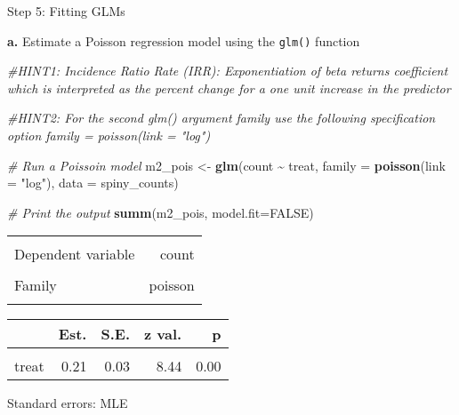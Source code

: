 \documentclass[
]{article}
\newenvironment{Shaded}{\begin{snugshade}}{\end{snugshade}}
\newcommand{\AttributeTok}[1]{\textcolor[rgb]{0.13,0.29,0.53}{#1}}
\newcommand{\CommentTok}[1]{\textcolor[rgb]{0.56,0.35,0.01}{\textit{#1}}}
\newcommand{\ConstantTok}[1]{\textcolor[rgb]{0.56,0.35,0.01}{#1}}
\newcommand{\FunctionTok}[1]{\textcolor[rgb]{0.13,0.29,0.53}{\textbf{#1}}}
\newcommand{\NormalTok}[1]{#1}
\newcommand{\OtherTok}[1]{\textcolor[rgb]{0.56,0.35,0.01}{#1}}
\newcommand{\SpecialCharTok}[1]{\textcolor[rgb]{0.81,0.36,0.00}{\textbf{#1}}}
\newcommand{\StringTok}[1]{\textcolor[rgb]{0.31,0.60,0.02}{#1}}
\begin{document}
Step 5: Fitting GLMs

\textbf{a.} Estimate a Poisson regression model using the \texttt{glm()}
function

\begin{Shaded}
\begin{Highlighting}[]
\CommentTok{\#HINT1: Incidence Ratio Rate (IRR): Exponentiation of beta returns coefficient which is interpreted as the \textquotesingle{}percent change\textquotesingle{} for a one unit increase in the predictor }

\CommentTok{\#HINT2: For the second glm() argument \textasciigrave{}family\textasciigrave{} use the following specification option \textasciigrave{}family = poisson(link = "log")\textasciigrave{}}

\CommentTok{\# Run a Poissoin model}
\NormalTok{m2\_pois }\OtherTok{\textless{}{-}} \FunctionTok{glm}\NormalTok{(count }\SpecialCharTok{\textasciitilde{}}\NormalTok{ treat,}
               \AttributeTok{family =} \FunctionTok{poisson}\NormalTok{(}\AttributeTok{link =} \StringTok{"log"}\NormalTok{),}
               \AttributeTok{data =}\NormalTok{ spiny\_counts)}

\CommentTok{\# Print the output}
\FunctionTok{summ}\NormalTok{(m2\_pois, }\AttributeTok{model.fit=}\ConstantTok{FALSE}\NormalTok{)}
\end{Highlighting}
\end{Shaded}

\begin{table}[!h]
\centering
\begin{tabular}{lr}
\toprule
\cellcolor{gray!10}{Observations} & \cellcolor{gray!10}{252}\\
Dependent variable & count\\
\cellcolor{gray!10}{Type} & \cellcolor{gray!10}{Generalized linear model}\\
Family & poisson\\
\cellcolor{gray!10}{Link} & \cellcolor{gray!10}{log}\\
\bottomrule
\end{tabular}
\end{table}  \begin{table}[!h]
\centering
\begin{threeparttable}
\begin{tabular}{lrrrr}
\toprule
  & Est. & S.E. & z val. & p\\
\midrule
\cellcolor{gray!10}{(Intercept)} & \cellcolor{gray!10}{3.12} & \cellcolor{gray!10}{0.02} & \cellcolor{gray!10}{171.74} & \cellcolor{gray!10}{0.00}\\
treat & 0.21 & 0.03 & 8.44 & 0.00\\
\bottomrule
\end{tabular}
\begin{tablenotes}
\item Standard errors: MLE
\end{tablenotes}
\end{threeparttable}
\end{table}
\end{document}

